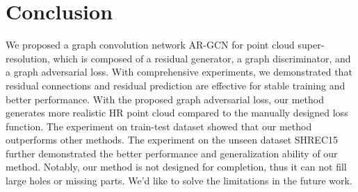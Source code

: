 \documentclass[10pt,twocolumn,letterpaper]{article}
\begin{document}
\section{Conclusion}
We proposed a graph convolution network AR-GCN for point cloud super-resolution, which is composed of a residual generator, a graph discriminator, and a graph adversarial loss.
With comprehensive experiments, we demonstrated that residual connections and residual prediction are effective for stable training and better performance.
With the proposed graph adversarial loss, our method generates more realistic HR point cloud compared to the manually designed loss function.
The experiment on train-test dataset showed that our method outperforms other methods.
The experiment on the unseen dataset SHREC15 further demonstrated the better performance and generalization ability of our method.
Notably, our method is not designed for completion, thus it can not fill large holes or missing parts.
We'd like to solve the limitations in the future work.


{\small


}
\end{document}
